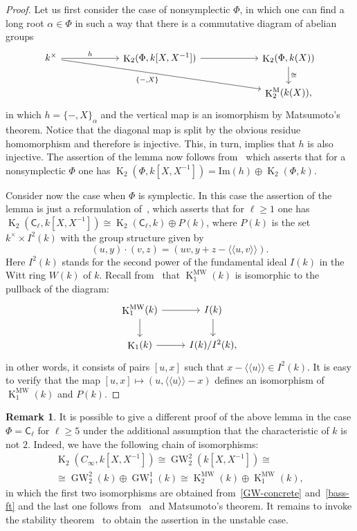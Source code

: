\documentclass[10pt,a4paper,twoside]{article}
\theoremstyle{remark}
\theoremstyle{definition}
\numberwithin{lemma}{section}
\numberwithin{prop}{section}
\numberwithin{corollary}{section}
\numberwithin{externaltheorem}{section}
\newtheorem{rem}[lemma]{Remark}
\DeclareMathOperator{\K}{K}
\DeclareMathOperator{\GW}{GW}
\newcommand{\inv}{^{-1}}
\newcommand{\rC}{\mathsf{C}}
\numberwithin{equation}{section}
\begin{document}
\begin{proof} Let us first consider the case of nonsymplectic $\Phi$, in which one can find a long root $\alpha\in \Phi$ in such a way that there is a commutative diagram of abelian groups
\[\begin{tikzcd}[column sep=5pc] k^\times \arrow{drr}[swap]{\{-, X\}} \arrow{r}{h}  & \K_2(\Phi, k[X, X^{-1}]) \arrow{r} & \K_2(\Phi, k(X)) \arrow{d}{\cong} \\
 & & \K_2^\mathrm{M}(k(X)), \end{tikzcd}\]
in which $h = \{ -, X \}_{\alpha}$ and the vertical map is an isomorphism by Matsumoto's theorem.
Notice that the diagonal map is split by the obvious residue homomorphism and therefore is injective. This, in turn, implies that $h$ is also injective.
The assertion of the lemma now follows from~\cite[Satz~3]{Hur77} which asserts that for a nonsymplectic $\Phi$ one has $\K_2(\Phi, k[X, X\inv]) = \mathrm{Im}(h) \oplus \K_2(\Phi, k)$.

Consider now the case when $\Phi$ is symplectic. In this case the assertion of the lemma is just a reformulation of~\cite[Theorem~B]{MR91},
which asserts that for $\ell \geq 1$ one has $\K_2(\rC_\ell, k[X, X\inv]) \cong \K_2(\rC_\ell, k) \oplus P(k)$, where
$P(k)$ is the set $k^\times \times I^2(k)$ with the group structure given by
\[ (u, y) \cdot (v, z) = (uv, y + z - \langle\langle u, v\rangle\rangle).\]
Here $I^2(k)$ stands for the second power of the fundamental ideal $I(k)$ in the Witt ring $W(k)$ of $k$.
Recall from~\cite{Mo04} that $\K_1^\mathrm{MW}(k)$ is isomorphic to the pullback of the diagram:
\[ \begin{tikzcd} \K_1^\mathrm{MW}(k) \arrow{r} \arrow{d} & I(k) \arrow{d} \\ \K_1(k) \arrow{r} & I(k)/I^2(k), \end{tikzcd} \]
in other words, it consists of pairs $[u, x]$ such that $x - \langle \langle u \rangle \rangle \in I^2(k)$.
It is easy to verify that the map $[u, x] \mapsto (u, \langle\langle u \rangle\rangle - x)$ defines an isomorphism of $\K_1^\mathrm{MW}(k)$ and $P(k)$. \end{proof}

\begin{rem} It is possible to give a different proof of the above lemma in the case $\Phi = \rC_\ell$ for $\ell \geq 5$ under the additional assumption that the characteristic of $k$ is not $2$. Indeed, we have the following chain of isomorphisms:
\begin{multline} \K_2(C_\infty, k[X, X^{-1}]) \cong \GW_2^2(k[X,X^{-1}]) \cong \\ \cong \GW_2^2(k) \oplus \GW_1^1(k) \cong \K_2^\mathrm{MW}(k) \oplus \K_1^\mathrm{MW}(k),\end{multline}
in which the first two isomorphisms are obtained from~\eqref{GW-concrete} and~\cref{bass-ft} and the last one follows from~\cite[Lemma~4.1.1]{AF17} and Matsumoto's theorem.
It remains to invoke the stability theorem~\cite[Theorem~9.4]{Pa89} to obtain the assertion in the unstable case. \end{rem}
\end{document}
